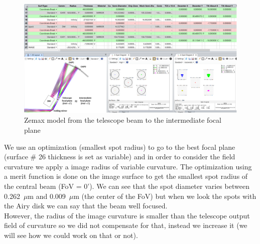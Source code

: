 \documentclass[12pt,a4paper]{article}
\begin{document}
\begin{figure}[H]
	\begin{center}
		\includegraphics[width=\textwidth]{images/Zemax_model_FP_OAP1.PNG}
		\caption{Zemax model from the telescope beam to the intermediate focal plane}\label{fig:Zemax_model_FP_OAP1}
	\end{center}
\end{figure}
We use an optimization (smallest spot radius) to go to the best focal plane (surface \# 26 thickness is set as variable) and in order to consider the field curvature we apply a image radius of variable curvature. The optimization using a merit function is done on the image surface to get the smallest spot radius of the central beam (FoV = 0'). We can see that the spot diameter varies between 0.262~$\mu$m and 0.009~$\mu$m (the center of the FoV) but when we look the spots with the Airy disk we can say that the beam well focused.\\
However, the radius of the image curvature is smaller than the telescope output field of curvature so we did not compensate for that, instead we increase it (we will see how we could work on that or not).\\
\end{document}
